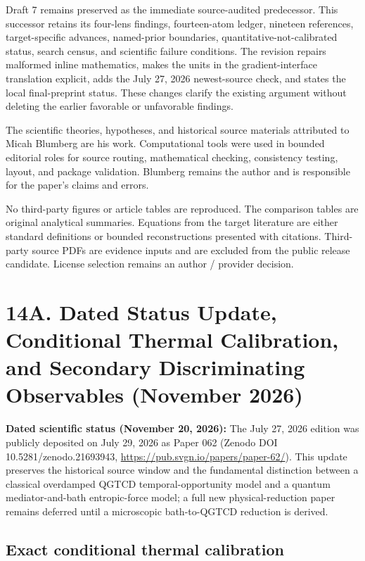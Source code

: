 \documentclass[
  american,
  11pt,
  letterpaper,
]{article}
\begin{document}
Draft 7 remains preserved as the immediate source-audited predecessor. This successor retains its four-lens findings, fourteen-atom ledger, nineteen references, target-specific advances, named-prior boundaries, quantitative-not-calibrated status, search census, and scientific failure conditions. The revision repairs malformed inline mathematics, makes the units in the gradient-interface translation explicit, adds the July 27, 2026 newest-source check, and states the local final-preprint status. These changes clarify the existing argument without deleting the earlier favorable or unfavorable findings.

The scientific theories, hypotheses, and historical source materials attributed to Micah Blumberg are his work. Computational tools were used in bounded editorial roles for source routing, mathematical checking, consistency testing, layout, and package validation. Blumberg remains the author and is responsible for the paper's claims and errors.

No third-party figures or article tables are reproduced. The comparison tables are original analytical summaries. Equations from the target literature are either standard definitions or bounded reconstructions presented with citations. Third-party source PDFs are evidence inputs and are excluded from the public release candidate. License selection remains an author / provider decision.

\section{14A. Dated Status Update, Conditional Thermal Calibration, and Secondary Discriminating Observables (November 2026)}\label{a.-dated-status-update-conditional-thermal-calibration-and-secondary-discriminating-observables-november-2026}

\textbf{Dated scientific status (November 20, 2026):} The July 27, 2026 edition was publicly deposited on July 29, 2026 as Paper 062 (Zenodo DOI 10.5281/zenodo.21693943, \url{https://pub.svgn.io/papers/paper-62/}). This update preserves the historical source window and the fundamental distinction between a classical overdamped QGTCD temporal-opportunity model and a quantum mediator-and-bath entropic-force model; a full new physical-reduction paper remains deferred until a microscopic bath-to-QGTCD reduction is derived.

\subsection{Exact conditional thermal calibration}\label{exact-conditional-thermal-calibration}
\end{document}
